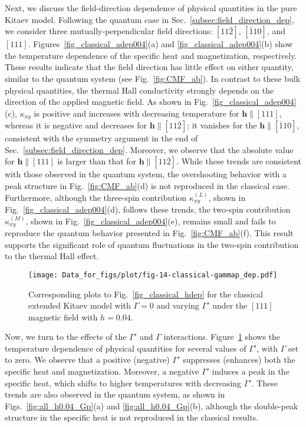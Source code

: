 \documentclass[twocolumn,superscriptaddress,showpacs, longbibliography, aps, prx]{revtex4-2}
\def\vec#1{\boldsymbol #1}
\begin{document}
Next, we discuss the field-direction dependence of physical quantities in the pure Kitaev model. 
Following the quantum case in Sec.~\ref{subsec:field_direction_dep}, we consider three mutually-perpendicular field directions: $[11\bar{2}]$, $[\bar{1}10]$, and $[111]$.
Figures~\ref{fig_classical_adep004}(a) and \ref{fig_classical_adep004}(b) show the temperature dependence of the specific heat and magnetization, respectively.
These results indicate that the field direction has little effect on either quantity, similar to the quantum system (see Fig.~\ref{fig:CMF_ab}). 
In contrast to these bulk physical quantities, the thermal Hall conductivity strongly depends on the direction of the applied magnetic field.
As shown in Fig.~\ref{fig_classical_adep004}(c), $\kappa_{xy}$ is positive and increases with decreasing temperature for $\vec{h}\parallel [111]$, whereas it is negative and decreases for
$\vec{h}\parallel [11\bar{2}]$; 
it vanishes for the $\vec{h}\parallel[\bar{1}10]$, consistent with the symmetry argument in the end of Sec.~\ref{subsec:field_direction_dep}.
Moreover, we observe that the absolute value for $\vec{h}\parallel [111]$ is larger than that for $\vec{h}\parallel [11\bar{2}]$.
While these trends are consistent with those observed in the quantum system, 
the overshooting behavior with a peak structure in Fig.~\ref{fig:CMF_ab}(d) is not reproduced in the classical case.
Furthermore, although the three-spin contribution $\kappa_{xy}^{(L)}$, shown in Fig.~\ref{fig_classical_adep004}(d), follows these trends, the two-spin contribution $\kappa_{xy}^{(M)}$, shown in Fig.~\ref{fig_classical_adep004}(e), remains small and fails to reproduce the quantum behavior presented in Fig.~\ref{fig:CMF_ab}(f). 
This result supports the significant role of quantum fluctuations in the two-spin contribution to the thermal Hall effect.

\begin{figure}[tbh] 
\begin{center} 
\texttt{[image: Data\_for\_figs/plot/fig-14-classical-gammap\_dep.pdf]}
\vspace{-0.5cm} 
\caption{Corresponding plots to Fig.~\ref{fig_classical_hdep} for the classical extended Kitaev model with $\Gamma=0$ and varying $\Gamma'$ under the $[111]$ magnetic field with $h=0.04$.
}
\label{fig_classical_gpdep004}
\end{center}
\end{figure}

Now, we turn to the effects of the $\Gamma'$ and $\Gamma$ interactions. 
Figure~\ref{fig_classical_gpdep004} shows the temperature dependence of physical quantities for several values of $\Gamma'$, with $\Gamma$ set to zero. 
We observe that a positive (negative) $\Gamma'$ suppresses (enhances) both the specific heat and magnetization.
Moreover, a negative $\Gamma'$ induces a peak in the specific heat, which shifts to higher temperatures with decreasing $\Gamma'$.
These trends are also observed in the quantum system, as shown in Figs.~\ref{fig:all_h0.04_Gp}(a) and \ref{fig:all_h0.04_Gp}(b), although the double-peak structure in the specific heat is not reproduced in the classical results.
\end{document}
